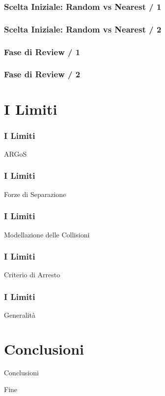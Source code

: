 \documentclass{beamer}
\begin{document}
\begin{frame}
\frametitle{Scelta Iniziale: Random vs Nearest / 1}
\end{frame}

\begin{frame}
\frametitle{Scelta Iniziale: Random vs Nearest / 2}
\end{frame}

\begin{frame}
\frametitle{Fase di Review / 1}
\end{frame}

\begin{frame}
\frametitle{Fase di Review / 2}
\end{frame}

\section{I Limiti}

\begin{frame}
\frametitle{I Limiti}
\centering
\Huge
ARGoS
\end{frame}

\begin{frame}
\frametitle{I Limiti}
\centering
\Huge
Forze di Separazione
\end{frame}

\begin{frame}
\frametitle{I Limiti}
\centering
\Huge
Modellazione delle Collisioni
\end{frame}

\begin{frame}
\frametitle{I Limiti}
\centering
\Huge
Criterio di Arresto
\end{frame}

\begin{frame}
\frametitle{I Limiti}
\centering
\Huge
Generalit\`a
\end{frame}

\section{Conclusioni}

\begin{frame}
\centering
\Huge
Conclusioni
\end{frame}

\begin{frame}
\centering
\Huge
Fine
\end{frame}
\end{document}
